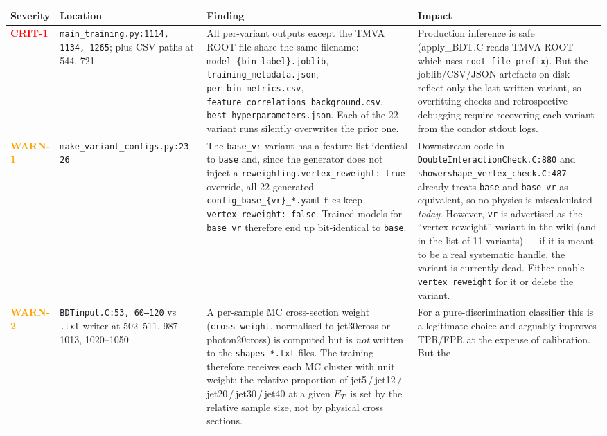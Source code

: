 \documentclass[11pt,a4paper]{article}
\newcommand{\etg}{$E_T$}
\newcommand{\crit}[1]{\textcolor{red}{\textbf{#1}}}
\newcommand{\warn}[1]{\textcolor{orange}{\textbf{#1}}}
\begin{document}
\begin{longtable}{@{}p{1.7cm}p{4.7cm}p{5.9cm}p{4.4cm}@{}}
\toprule
Severity & Location & Finding & Impact \\
\midrule
\crit{CRIT-1} & \texttt{main\_training.py:1114, 1134, 1265}; plus CSV paths at 544, 721 &
 All per-variant outputs except the TMVA ROOT file share the same
 filename: \texttt{model\_\{bin\_label\}.joblib},
 \texttt{training\_metadata.json},
 \texttt{per\_bin\_metrics.csv},
 \texttt{feature\_correlations\_background.csv},
 \texttt{best\_hyperparameters.json}. Each of the 22 variant runs
 silently overwrites the prior one. &
 Production inference is safe (apply\_BDT.C reads TMVA ROOT which uses
 \texttt{root\_file\_prefix}). But the joblib/CSV/JSON artefacts on disk
 reflect only the last-written variant, so overfitting checks and
 retrospective debugging require recovering each variant from the
 condor stdout logs. \\
\addlinespace
\warn{WARN-1} & \texttt{make\_variant\_configs.py:23--26} &
 The \texttt{base\_vr} variant has a feature list identical to
 \texttt{base} and, since the generator does not inject a
 \texttt{reweighting.vertex\_reweight: true} override, all 22 generated
 \texttt{config\_base\_\{vr\}\_*.yaml} files keep
 \texttt{vertex\_reweight: false}. Trained models for \texttt{base\_vr}
 therefore end up bit-identical to \texttt{base}. &
 Downstream code in \texttt{DoubleInteractionCheck.C:880} and
 \texttt{showershape\_vertex\_check.C:487} already treats
 \texttt{base} and \texttt{base\_vr} as equivalent, so no physics is
 miscalculated \emph{today}. However, \texttt{vr} is advertised as the
 ``vertex reweight'' variant in the wiki (and in the list of 11
 variants) --- if it is meant to be a real systematic handle, the
 variant is currently dead. Either enable \texttt{vertex\_reweight}
 for it or delete the variant. \\
\addlinespace
\warn{WARN-2} & \texttt{BDTinput.C:53, 60--120} vs \texttt{.txt} writer at 502--511, 987--1013, 1020--1050 &
 A per-sample MC cross-section weight (\texttt{cross\_weight},
 normalised to jet30cross or photon20cross) is computed but is
 \emph{not} written to the \texttt{shapes\_*.txt} files. The training
 therefore receives each MC cluster with unit weight; the relative
 proportion of jet5\,/\,jet12\,/\,jet20\,/\,jet30\,/\,jet40 at a given
 \etg\ is set by the relative sample size, not by physical cross
 sections. &
 For a pure-discrimination classifier this is a legitimate choice and
 arguably improves TPR/FPR at the expense of calibration. But the

\end{longtable}
\end{document}
